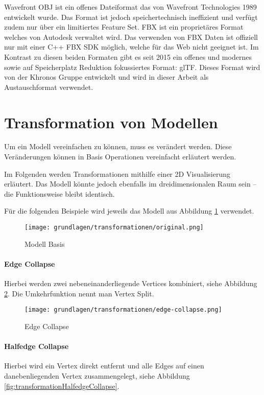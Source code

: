 Wavefront OBJ ist ein offenes Dateiformat das von Wavefront Technologies 1989 entwickelt wurde. Das Format ist jedoch speichertechnisch ineffizient und verfügt zudem nur über ein limitiertes Feature Set.
FBX ist ein proprietäres Format welches von Autodesk verwaltet wird. Das verwenden von FBX Daten ist offiziell nur mit einer C++ FBX SDK möglich, welche für das Web nicht geeignet ist.
Im Kontrast zu diesen beiden Formaten gibt es seit 2015 ein offenes und modernes sowie auf Speicherplatz Reduktion fokussiertes Format: glTF. Dieses Format wird von der Khronos Gruppe entwickelt und wird in dieser Arbeit als Austauschformat verwendet.

\section{Transformation von Modellen}

Um ein Modell vereinfachen zu können, muss es verändert werden.
Diese Veränderungen können in Basis Operationen vereinfacht erläutert werden.

Im Folgenden werden Transformationen mithilfe einer 2D Visualisierung erläutert. Das Modell könnte jedoch ebenfalls im dreidimensionalen Raum sein – die Funktionsweise bleibt identisch.

Für die folgenden Beispiele wird jeweils das Modell aus Abbildung \ref{fig:transformationOriginal} verwendet.

\begin{figure}[H]
  \centering
  \texttt{[image: grundlagen/transformationen/original.png]}
  \caption{Modell Basis}
  \label{fig:transformationOriginal}
\end{figure}

\paragraph{Edge Collapse}
Hierbei werden zwei nebeneinanderliegende Vertices kombiniert, siehe Abbildung \ref{fig:transformationEdgeCollapse}.
Die Umkehrfunktion nennt man Vertex Split.

\begin{figure}[H]
  \centering
  \texttt{[image: grundlagen/transformationen/edge-collapse.png]}
  \caption{Edge Collapse}
  \label{fig:transformationEdgeCollapse}
\end{figure}

\paragraph{Halfedge Collapse}
Hierbei wird ein Vertex direkt entfernt und alle Edges auf einen danebenliegenden Vertex zusammengelegt, siehe Abbildung \ref{fig:transformationHalfedgeCollapse}.


